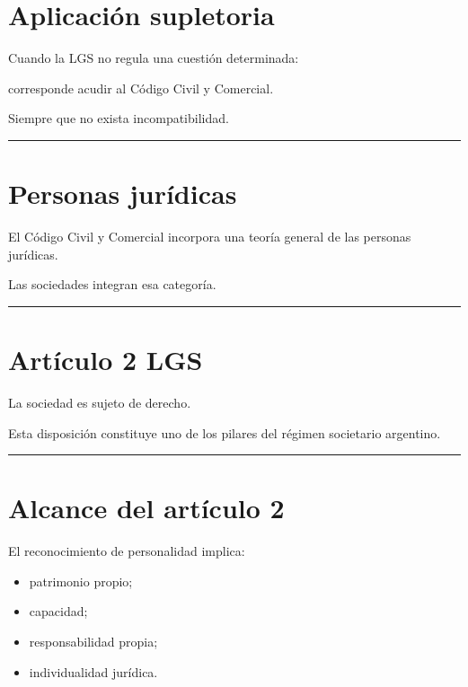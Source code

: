 \documentclass[
  spanish,
  letterpaper,
  DIV=11,
  numbers=noendperiod]{scrartcl}
\providecommand{\tightlist}{%
  \setlength{\itemsep}{0pt}\setlength{\parskip}{0pt}}
\begin{document}
\section{Aplicación supletoria}\label{aplicaciuxf3n-supletoria}

Cuando la LGS no regula una cuestión determinada:

corresponde acudir al Código Civil y Comercial.

Siempre que no exista incompatibilidad.

\begin{center}\rule{0.5\linewidth}{0.5pt}\end{center}

\section{Personas jurídicas}\label{personas-juruxeddicas}

El Código Civil y Comercial incorpora una teoría general de las personas
jurídicas.

Las sociedades integran esa categoría.

\begin{center}\rule{0.5\linewidth}{0.5pt}\end{center}

\section{Artículo 2 LGS}\label{artuxedculo-2-lgs}

La sociedad es sujeto de derecho.

Esta disposición constituye uno de los pilares del régimen societario
argentino.

\begin{center}\rule{0.5\linewidth}{0.5pt}\end{center}

\section{Alcance del artículo 2}\label{alcance-del-artuxedculo-2}

El reconocimiento de personalidad implica:

\begin{itemize}
\tightlist
\item
  patrimonio propio;
\item
  capacidad;
\item
  responsabilidad propia;
\item
  individualidad jurídica.
\end{itemize}
\end{document}

